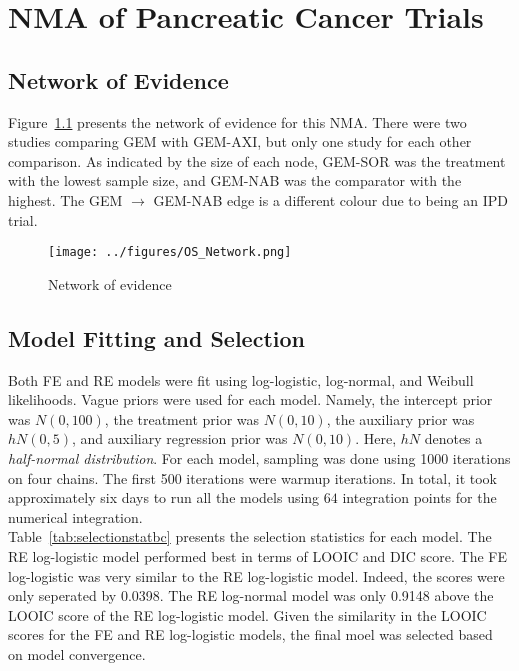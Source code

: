 \chapter{NMA of Pancreatic Cancer Trials}\label{nmachap}

\section{Network of Evidence}
Figure~\ref{fig:osnet} presents the network of evidence for this NMA. There were two studies comparing GEM with GEM-AXI, but only one study for each other comparison. As indicated by the size of each node, GEM-SOR was the treatment with the lowest sample size, and GEM-NAB was the comparator with the highest. The GEM $\to$ GEM-NAB edge is a different colour due to being an IPD trial. 

\begin{figure}[h]
    \centering
    \texttt{[image: ../figures/OS\_Network.png]}
    \caption{Network of evidence}
    \label{fig:osnet}
\end{figure}

\section{Model Fitting and Selection}
Both FE and RE models were fit using log-logistic, log-normal, and Weibull likelihoods. Vague priors were used for each model. Namely, the intercept prior was $N(0, 100)$, the treatment prior was $N(0, 10)$, the auxiliary prior was $hN(0, 5)$, and auxiliary regression prior was $N(0, 10)$. Here, $hN$ denotes a \textit{half-normal distribution}. For each model, sampling was done using 1000 iterations on four chains. The first 500 iterations were warmup iterations. In total, it took approximately six days to run all the models using $64$ integration points for the numerical integration.\\

Table~\ref{tab:selectionstatbc} presents the selection statistics for each model. The RE log-logistic model performed best in terms of LOOIC and DIC score. The FE log-logistic was very similar to the RE log-logistic model. Indeed, the scores were only seperated by 0.0398. The RE log-normal model was only 0.9148 above the LOOIC score of the RE log-logistic model. Given the similarity in the LOOIC scores for the FE and RE log-logistic models, the final moel was selected based on model convergence. \\

